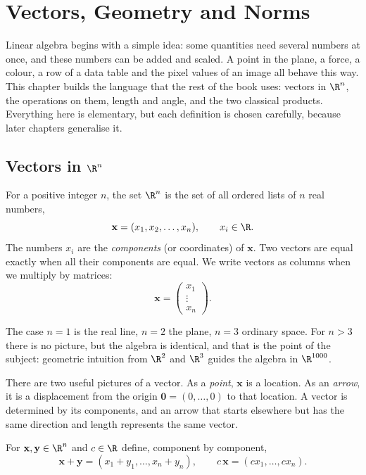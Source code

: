 \chapter{Vectors, Geometry and Norms}

Linear algebra begins with a simple idea: some quantities need several numbers at once, and these numbers can be added and scaled. A point in the plane, a force, a colour, a row of a data table and the pixel values of an image all behave this way. This chapter builds the language that the rest of the book uses: vectors in $\R^n$, the operations on them, length and angle, and the two classical products. Everything here is elementary, but each definition is chosen carefully, because later chapters generalise it.

\section{Vectors in $\R^n$}

\begin{definition}[Vector in $\R^n$]
For a positive integer $n$, the set $\R^n$ is the set of all ordered lists of $n$ real numbers,
\[ \mathbf{x}=(x_1,x_2,\dots,x_n),\qquad x_i\in\R. \]
The numbers $x_i$ are the \emph{components} (or coordinates) of $\mathbf{x}$. Two vectors are equal exactly when all their components are equal. We write vectors as columns when we multiply by matrices:
\[ \mathbf{x}=\begin{pmatrix}x_1\\ \vdots\\ x_n\end{pmatrix}. \]
\end{definition}

The case $n=1$ is the real line, $n=2$ the plane, $n=3$ ordinary space. For $n>3$ there is no picture, but the algebra is identical, and that is the point of the subject: geometric intuition from $\R^2$ and $\R^3$ guides the algebra in $\R^{1000}$.

There are two useful pictures of a vector. As a \emph{point}, $\mathbf{x}$ is a location. As an \emph{arrow}, it is a displacement from the origin $\mathbf{0}=(0,\dots,0)$ to that location. A vector is determined by its components, and an arrow that starts elsewhere but has the same direction and length represents the same vector.

\begin{definition}
For $\mathbf{x},\mathbf{y}\in\R^n$ and $c\in\R$ define, component by component,
\[ \mathbf{x}+\mathbf{y}=(x_1+y_1,\dots,x_n+y_n),\qquad c\,\mathbf{x}=(cx_1,\dots,cx_n). \]
\end{definition}

